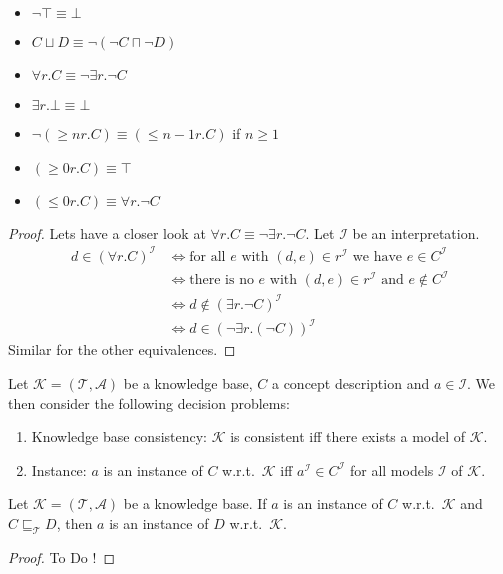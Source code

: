 \begin{lemma}
	\begin{itemize}
		\item $\neg \top \equiv \bot$
		\item $C \sqcup D \equiv \neg \left( \neg C \sqcap \neg D \right)$
		\item $\forall r.C \equiv \neg \exists r.\neg C$
		\item $\exists r.\bot \equiv \bot$
		\item $\neg \left( \geq nr.C \right) \equiv \left( \leq n-1 r.C \right)$ if $n \geq 1$
		\item $\left( \geq 0 r.C \right) \equiv \top$
		\item $\left( \leq 0r.C \right) \equiv \forall r.\neg C$
	 \end{itemize}
\end{lemma}
\begin{proof}
	Lets have a closer look at $\forall r.C \equiv \neg \exists r.\neg C $.
	Let $\mathcal{I}$ be an interpretation.
	\begin{align*}
		d \in \left( \forall r.C \right)^{\mathcal{I}} & \iff \text{for all $e$ with $(d,e)\in r^{\mathcal{I}}$ we have $e \in C^{\mathcal{I}}$} \\
							& \iff \text{there is no $e$ with $(d,e)\in r^{\mathcal{I}}$ and $e \notin C^{\mathcal{I}}$} \\
							& \iff d  \notin \left( \exists r.\neg C \right)^{\mathcal{I}} \\
							& \iff d \in \left( \neg \exists r.(\neg C) \right)^{\mathcal{I}}
	\end{align*}
	Similar for the other equivalences. \qedhere
\end{proof}

\begin{definition}
	Let $\mathcal{K} = \left( \mathcal{T}, \mathcal{A} \right)$ be a knowledge base, 
	$C$ a concept description and $a \in \mathscr{I}$.
	We then consider the following decision problems:
	\begin{enumerate}
		\item Knowledge base consistency: $\mathcal{K}$ is consistent iff there exists a model of $\mathcal{K}$.
		\item Instance: $a$ is an instance of $C$ w.r.t.\ $\mathcal{K}$ iff $a^{\mathcal{I}} \in C^{\mathcal{I}}$ 
			for all models $\mathcal{I}$ of $\mathcal{K}$.
	\end{enumerate}
\end{definition}
\begin{lemma}
	Let $\mathcal{K} = \left( \mathcal{T}, \mathcal{A} \right)$ be a knowledge base.
	If $a$ is an instance of $C$ w.r.t.\ $\mathcal{K}$ and $C \sqsubseteq_{\mathcal{T}} D$,
	then $a$ is an instance of $D$ w.r.t.\ $\mathcal{K}$.
\end{lemma}
\begin{proof}
	To Do !
\end{proof}

